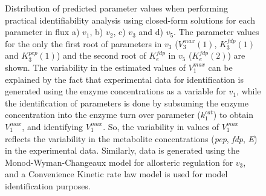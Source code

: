 \documentclass[10pt]{article}
\begin{document}
	\begin{figure}[!tbhp]
		\caption{Distribution of predicted parameter values when performing practical identifiability analysis using closed-form solutions for each parameter in flux a) $v_1$, b) $v_2$, c) $v_3$ and d) $v_5$. The parameter values for the only the first root of parameters in $v_3$ ($V_3^{max}(1)$, $K_3^{fdp}(1)$ and $K_3^{pep}(1)$) and the second root of $K_e^{fdp}$ in $v_5$ ($K_e^{fdp}(2)$) are shown. The variability in the estimated values of $V_1^{max}$ can be explained by the fact that experimental data for identification is generated using the enzyme concentrations as a variable for $v_1$, while the identification of parameters is done by subsuming the enzyme concentration into the enzyme turn over parameter ($k_1^{cat}$) to obtain $V_1^{max}$, and identifying $V_1^{max}$. So, the variability in values of $V_1^{max}$ reflects the variability in the metabolite concentrations (\textit{pep}, \textit{fdp}, \textit{E}) in the experimental data. Similarly, data is generated using the Monod-Wyman-Changeaux model for allosteric regulation for $v_3$, and a Convenience Kinetic rate law model is used for model identification purposes.}\label{fig:parameter_value_v1_vmax}
	\end{figure}		
\end{document}
